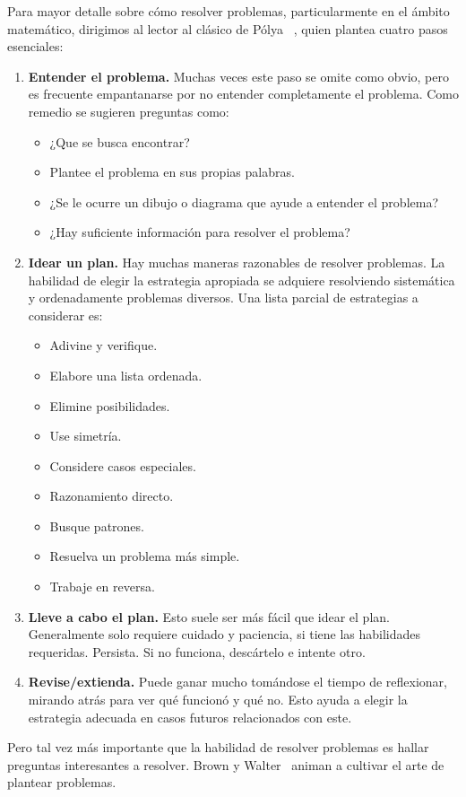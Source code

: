   Para mayor detalle sobre cómo resolver problemas,
  particularmente en el ámbito matemático,
  dirigimos al lector al clásico de Pólya~%
    \cite{polya45:_how_to_solve_it},%
  quien plantea cuatro pasos esenciales:
  \begin{enumerate}
  \item
    \textbf{Entender el problema.}
    Muchas veces este paso se omite como obvio,
    pero es frecuente empantanarse
    por no entender completamente el problema.
    Como remedio se sugieren preguntas como:
    \begin{itemize}
    \item
      ¿Que se busca encontrar?
    \item
      Plantee el problema en sus propias palabras.
    \item
      ¿Se le ocurre un dibujo o diagrama
      que ayude a entender el problema?
    \item
      ¿Hay suficiente información para resolver el problema?
    \end{itemize}
  \item
    \textbf{Idear un plan.}
    Hay muchas maneras razonables de resolver problemas.
    La habilidad de elegir la estrategia apropiada
    se adquiere resolviendo sistemática y ordenadamente
    problemas diversos.
    Una lista parcial de estrategias a considerar es:
    \begin{itemize}
    \item
      Adivine y verifique.
    \item
      Elabore una lista ordenada.
    \item
      Elimine posibilidades.
    \item
      Use simetría.
    \item
      Considere casos especiales.
    \item
      Razonamiento directo.
    \item
      Busque patrones.
    \item
      Resuelva un problema más simple.
    \item
      Trabaje en reversa.
    \end{itemize}
  \item
    \textbf{Lleve a cabo el plan.}
    Esto suele ser más fácil que idear el plan.
    Generalmente solo requiere cuidado y paciencia,
    si tiene las habilidades requeridas.
    Persista.
    Si no funciona,
    descártelo e intente otro.
  \item
    \textbf{Revise/extienda.}
    Puede ganar mucho tomándose el tiempo de reflexionar,
    mirando atrás para ver qué funcionó y qué no.
    Esto ayuda a elegir la estrategia adecuada en casos futuros
    relacionados con este.
  \end{enumerate}
  Pero tal vez más importante que la habilidad de resolver problemas
  es hallar preguntas interesantes a resolver.
  Brown y Walter~\cite{brown05:_art_problem_posing}
  animan a cultivar el arte de plantear problemas.

